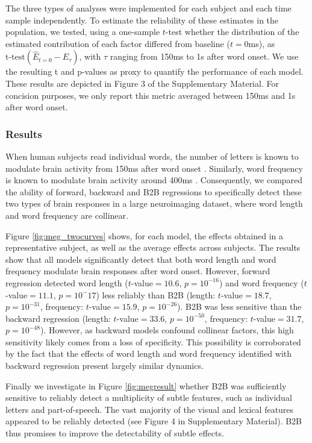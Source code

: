 The three types of analyses were implemented for each subject and each time
sample independently. To estimate the reliability of these estimates in the
population, we tested, using a one-sample $t$-test whether the distribution of
the estimated contribution of each factor differed from baseline ($t=0$ms),
as $\text{t-test}(\hat E_{t=0} - \hat E_{\tau})$, with $\tau$ ranging from
150ms to 1s after word onset. We use the resulting t and p-values as proxy to
quantify the performance of each model. These results are depicted in Figure
3 of the Supplementary Material. For concision purposes, we only report this metric averaged
between 150ms and 1s after word onset.

\subsubsection{Results}
When human subjects read individual words, the number of letters is known to modulate
brain activity from 150ms after word onset \citep{pegado2014timing}.
Similarly, word frequency is known to modulate brain activity around 400ms
\citep{kutas2011thirty}. Consequently, we compared the ability of forward, backward and B2B regressions to specifically detect these two types of brain responses in a large neuroimaging dataset, where word length and word frequency are collinear.

Figure \ref{fig:meg_twocurves} shows, for each model, the effects obtained
in a representative subject, as well as the average effects across subjects.
The results show that all models significantly detect that both word length and
word frequency modulate brain responses after word onset. However,
forward regression detected word length ($t$-value$=10.6$, $p=10^{-16}$) and
word frequency ($t$-value$=11.1$, $p=10^-17$) less reliably than B2B (length:
$t$-value$=18.7$, $p=10^{-31}$, frequency: $t$-value$=15.9$, $p=10^{-26}$). B2B
was less sensitive than the backward regression (length: $t$-value$=33.6$,
$p=10^{-50}$, frequency: $t$-value$=31.7$, $p=10^{-48}$). However, as backward models confound collinear factors, this high sensitivity likely comes from a loss of specificity. This possibility is corroborated by the fact that the effects of word length and word frequency identified with backward regression present largely similar dynamics.

Finally we investigate in Figure \ref{fig:megresult} whether B2B was sufficiently sensitive to reliably detect a multiplicity of subtle features, such as individual letters and part-of-speech. The vast majority of the visual and lexical features appeared to be reliably detected (see Figure 4 in Supplementary Material). B2B thus promises to improve the detectability of subtle effects.

